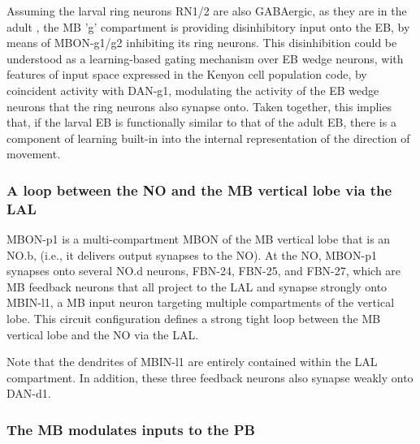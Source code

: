     Assuming the larval ring neurons RN1/2 are also GABAergic, as they are in the adult \citep{hanesch1989neuronal}, the MB 'g' compartment is providing disinhibitory input onto the EB, by means of MBON-g1/g2 inhibiting its ring neurons.
    This disinhibition could be understood as a learning-based gating mechanism over EB wedge neurons, with features of input space expressed in the Kenyon cell population code, by coincident activity with DAN-g1, modulating the activity of the EB wedge neurons that the ring neurons also synapse onto.
    Taken together, this implies that, if the larval EB is functionally similar to that of the adult EB, there is a component of learning built-in into the internal representation of the direction of movement.

    \subsubsection{A loop between the NO and the MB vertical lobe via the LAL}

    MBON-p1 is a multi-compartment MBON of the MB vertical lobe that is an NO.b, (i.e., it delivers output synapses to the NO).
    At the NO, MBON-p1 synapses onto several NO.d neurons, FBN-24, FBN-25, and FBN-27, which are MB feedback neurons \citep{eschbach2020recurrent} that all project to the LAL and synapse strongly onto MBIN-l1, a MB input neuron targeting multiple compartments of the vertical lobe.
    This circuit configuration defines a strong tight loop between the MB vertical lobe and the NO via the LAL.

    Note that the dendrites of MBIN-l1 are entirely contained within the LAL compartment.
    In addition, these three feedback neurons also synapse weakly onto DAN-d1.


    \subsubsection{The MB modulates inputs to the PB}

